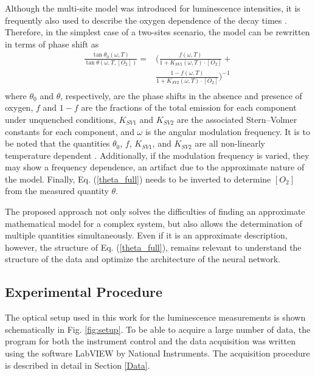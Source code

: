 \documentclass[final,5p,times,twocolumn]{elsarticle}
\begin{document}
Although the multi-site model was introduced for luminescence intensities, it is frequently also used to describe the oxygen dependence of the decay times \cite{Demas1995,Quaranta2012}. Therefore, in the simplest case of a two-sites scenario, the model can be rewritten in terms of phase shift as \cite{Michelucci2019}
\begin{equation}
\begin{aligned}
\frac{\tan \theta_0 (\omega, T)}{\tan \theta (\omega, T, [O_2])}=
 & \bigg( \frac{f (\omega , T) }{1+K_{SV1} (\omega , T) \cdot \left[O_2\right]}+ \\
&\frac{1-f (\omega , T) }{1+K_{SV2} (\omega , T) \cdot \left[O_2\right]} \bigg)^{-1} \\
\label{theta_full}
\end{aligned}
\end{equation}
where $\theta_0$ and $\theta$, respectively, are the phase shifts in the absence and presence of oxygen, $f$ and $1-f$ are the fractions of the total emission for each component under unquenched conditions, $K_{SV1}$ and $K_{SV2}$ are the associated Stern–Volmer constants for each component, and $\omega$ is the angular modulation frequency. It is to be noted that the quantities $\theta_0$, $f$, $K_{SV1}$, and $K_{SV2}$ are all non-linearly temperature dependent \cite{Ogurtsov2006,lo2008,Zaitsev2016}. Additionally, if the modulation frequency is varied, they may show a frequency dependence, an artifact due to the approximate nature of the model. Finally, Eq. (\ref{theta_full}) needs to be inverted to determine $[O_2]$ from the measured quantity $\theta$.

The proposed approach not only solves the difficulties of finding an approximate mathematical model for a complex system, but also allows the determination of multiple quantities simultaneously. Even if it is an approximate description, however, the structure of Eq. (\ref{theta_full}), remains relevant to understand the structure of the data and optimize the architecture of the neural network.


\subsection{Experimental Procedure}
\label{Experimental}

The optical setup used in this work for the luminescence measurements is shown schematically in Fig. \ref{fig:setup}. To be able to acquire a large number of data, the program for both the instrument control and the data acquisition was written using the software LabVIEW by National Instruments. The acquisition procedure is described in detail in Section \ref{Data}.
\end{document}
